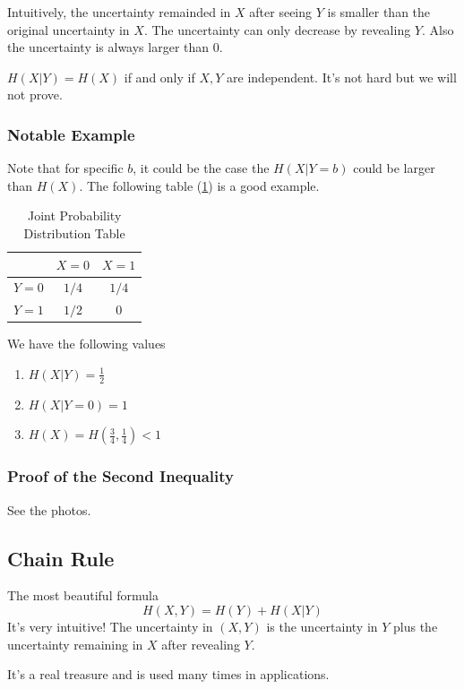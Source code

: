 \documentclass{article}
\begin{document}
Intuitively, the uncertainty remainded in $X$ after seeing $Y$ is smaller than the original uncertainty in $X$. The uncertainty can only decrease by revealing $Y$. Also the uncertainty is always larger than $0$.

$H(X|Y)=H(X)$ if and only if $X,Y$ are independent. It's not hard but we will not prove.

\subsubsection{Notable Example}

Note that for specific $b$, it could be the case the $H(X|Y=b)$ could be larger than $H(X)$. The following table (\ref{tab:joint_prob_dist}) is a good example.
\begin{table}[h]
\centering
\begin{tabular}{|c|c|c|}
\hline
& $X=0$ & $X=1$ \\ \hline
$Y=0 $ & $1/4$ & $1/4$  \\ \hline
$Y=1$ & $1/2$ & 0  \\ \hline
\end{tabular}
\caption{Joint Probability Distribution Table}
\label{tab:joint_prob_dist}
\end{table}

We have the following values
\begin{enumerate}
    \item $H(X|Y)=\frac{1}{2}$
    \item $H(X|Y=0)=1$
    \item $H(X)=H(\frac{3}{4},\frac{1}{4} )<1$
\end{enumerate}

\subsubsection{Proof of the Second Inequality}

See the photos.

\subsection{Chain Rule}

The most beautiful formula 
\[
H(X,Y) =H(Y) + H(X|Y)
\]
It's very intuitive! The uncertainty in $(X,Y)$ is the uncertainty in $Y$ plus the uncertainty remaining in $X$ after revealing $Y$.

It's a real treasure and is used many times in applications. 
\end{document}
